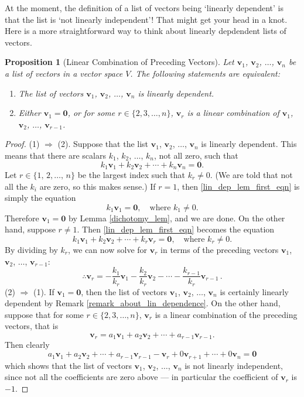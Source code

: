 \documentclass[a4paper,11pt]{book}
\newtheorem{proposition}[theorem]{Proposition}
\theoremstyle{definition}
\newcommand{\be}{\begin{equation}}
\newcommand{\ee}{\end{equation}}
\newcommand{\ve}[1]{\mathbf{#1}}
\begin{document}
At the moment, the definition of a list of vectors being `linearly dependent' is that the list is `not linearly independent'! That might get your head in a knot. Here is a more straightforward way to think about linearly depdendent lists of vectors.
\begin{proposition}[Linear Combination of Preceding Vectors] \label{lin_dependence_prop} Let $\ve{v}_1$, $\ve{v}_2$, $\ldots$, $\ve{v}_n$ be a list of vectors in a vector space $V$. The following statements are equivalent:
\begin{enumerate} \item The list of vectors $\ve{v}_1$, $\ve{v}_2$, $\ldots$, $\ve{v}_n$ is linearly dependent.
\item Either $\ve{v}_1 = \ve{0}$, or for some $r \in \{2, 3, \ldots, n\}$, $\ve{v}_r$ is a linear combination of $\ve{v}_1$, $\ve{v}_2$, $\ldots$, $\ve{v}_{r-1}$.
\end{enumerate}
\end{proposition}
\begin{proof} (1) $\Rightarrow$ (2). Suppose that the list $\ve{v}_1$, $\ve{v}_2$, $\ldots$, $\ve{v}_n$ is linearly dependent. This means that there are scalars $k_1$, $k_2$, $\ldots$, $k_n$, not all zero, such that
\be \label{lin_dep_lem_first_eqn}
 k_1 \ve{v}_1 + k_2 \ve{v}_2 + \cdots + k_n \ve{v}_n = \ve{0}.
\ee
Let $r \in \{1, \,2, \ldots, \, n\}$ be the largest index such that $k_r \neq 0$. (We are told that not all the $k_i$ are zero, so this makes sense.) If $r=1$, then \eqref{lin_dep_lem_first_eqn} is simply the equation
\[
 k_1 \ve{v}_1 = \ve{0}, \quad \mbox{where } k_1 \neq 0.
\]
Therefore $\ve{v}_1 = \ve{0}$ by Lemma \ref{dichotomy_lem}, and we are done. On the other hand, suppose $r \neq 1$. Then \eqref{lin_dep_lem_first_eqn} becomes the equation
\[
 k_1 \ve{v}_1 + k_2 \ve{v}_2 + \cdots + k_r \ve{v}_r = \ve{0}, \quad \mbox{where } k_r \neq 0.
\]
By dividing by $k_r$, we can now solve for $\ve{v}_r$ in terms of the preceding vectors $\ve{v}_1$, $\ve{v}_2$, $\ldots$, $\ve{v}_{r-1}$:
\[
 \therefore \ve{v}_r = - \frac{k_1}{k_r} \ve{v}_1 - \frac{k_2}{k_r} \ve{v}_2 - \cdots - \frac{k_{r-1}}{k_r} \ve{v}_{r-1} \, .
\]
(2) $\Rightarrow$ (1). If $\ve{v}_1 = \ve{0}$, then the list of vectors $\ve{v}_1$, $\ve{v}_2$, $\ldots$, $\ve{v}_n$ is certainly linearly dependent by Remark \ref{remark_about_lin_dependence}. On the other hand, suppose that for some $r \in \{2, 3, \ldots, n\}$, $\ve{v}_r$ is a linear combination of the preceding vectors, that is
\[
 \ve{v}_r = a_1 \ve{v}_1 + a_2 \ve{v}_2 + \cdots + a_{r-1} \ve{v}_{r-1}.
\]
Then clearly
\[
 a_1 \ve{v}_1 + a_2 \ve{v}_2 + \cdots + a_{r-1} \ve{v}_{r-1} - \ve{v}_r + 0 \ve{v}_{r+1} + \cdots + 0 \ve{v}_n = \ve{0}
\]
which shows that the list of vectors $\ve{v}_1$, $\ve{v}_2$, $\ldots$, $\ve{v}_n$ is not linearly independent, since not all the coefficients are zero above --- in particular the coefficient of $\ve{v}_r$ is $-1$.
\end{proof}
\end{document}
